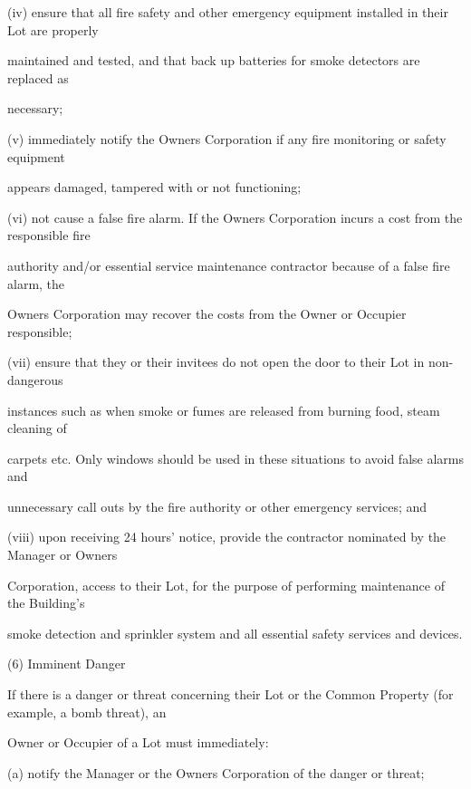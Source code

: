 \documentclass{article}
\begin{document}
{\fontsize{9.962}{1}(iv) ensure that all fire safety and other emergency equipment installed in their Lot are properly }

{\fontsize{10.02}{1}maintained and tested, and that back up batteries for smoke detectors are replaced as }

{\fontsize{10.02}{1}necessary; }

{\fontsize{9.962}{1}(v) immediately notify the Owners Corporation if any fire monitoring or safety equipment }

{\fontsize{10.02}{1}appears damaged, tampered with or not functioning; }

{\fontsize{9.962}{1}(vi) not cause a false fire alarm. If the Owners Corporation incurs a cost from the responsible fire }

{\fontsize{10.02}{1}authority and/or essential service maintenance contractor because of a false fire alarm, the }

{\fontsize{10.02}{1}Owners Corporation may recover the costs from the Owner or Occupier responsible; }

{\fontsize{9.962}{1}(vii) ensure that they or their invitees do not open the door to their Lot in non-dangerous }

{\fontsize{10.02}{1}instances such as when smoke or fumes are released from burning food, steam cleaning of }

{\fontsize{10.02}{1}carpets etc. Only windows should be used in these situations to avoid false alarms and }

{\fontsize{10.02}{1}unnecessary call outs by the fire authority or other emergency services; and }

{\fontsize{9.962}{1}(viii) upon receiving 24 hours’ notice, provide the contractor nominated by the Manager or Owners }

{\fontsize{10.02}{1}Corporation, access to their Lot, for the purpose of performing maintenance of the Building’s }

{\fontsize{10.02}{1}smoke detection and sprinkler system and all essential safety services and devices. }

{\fontsize{9.962}{1}(6) Imminent Danger }

{\fontsize{10.02}{1}If there is a danger or threat concerning their Lot or the Common Property (for example, a bomb threat), an }

{\fontsize{10.02}{1}Owner or Occupier of a Lot must immediately: }

{\fontsize{9.962}{1}(a) notify the Manager or the Owners Corporation of the danger or threat; }
\end{document}
